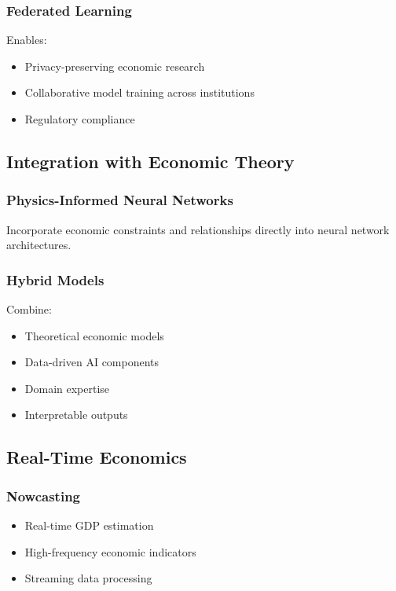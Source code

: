 \documentclass[12pt,a4paper]{article}
\begin{document}
\subsubsection{Federated Learning}
Enables:
\begin{itemize}
    \item Privacy-preserving economic research
    \item Collaborative model training across institutions
    \item Regulatory compliance
\end{itemize}

 

\subsection{Integration with Economic Theory}

\subsubsection{Physics-Informed Neural Networks}
Incorporate economic constraints and relationships directly into neural network architectures.

\subsubsection{Hybrid Models}
Combine:
\begin{itemize}
    \item Theoretical economic models
    \item Data-driven AI components
    \item Domain expertise
    \item Interpretable outputs
\end{itemize}

\subsection{Real-Time Economics}

\subsubsection{Nowcasting}
\begin{itemize}
    \item Real-time GDP estimation
    \item High-frequency economic indicators
    \item Streaming data processing
\end{itemize}
\end{document}
